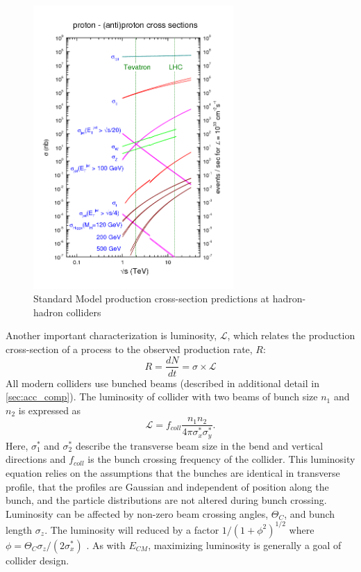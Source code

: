 \begin{figure}[h]
    \centering
    \includegraphics[width=3in]{figures/chapter2/cross_sec_plot.png}
    \caption{Standard Model production cross-section predictions at hadron-hadron colliders\cite{prod_crosssec}}
    \label{fig:crosssec}
\end{figure}

Another important characterization is luminosity, $\mathcal{L}$, which relates the production cross-section of a process to the observed production rate, $R$: $$R=\frac{dN}{dt}=\sigma\times\mathcal{L}$$ \noindent All modern colliders use bunched beams (described in additional detail in \ref{sec:acc_comp}). The luminosity of collider with two beams of bunch size $n_1$ and $n_2$ is expressed as $$\mathcal{L}=f_{coll}\frac{n_1n_2}{4\pi\sigma_x^*\sigma_y^*}.$$ \noindent Here, $\sigma_1^*$ and $\sigma_2^*$ describe the transverse beam size in the bend and vertical directions and $f_{coll}$ is the bunch crossing frequency of the collider. This luminosity equation relies on the assumptions that the bunches are identical in transverse profile, that the profiles are Gaussian and independent of position along the bunch, and the particle distributions are not altered during bunch crossing. Luminosity can be affected by non-zero beam crossing angles, $\Theta_C$, and bunch length $\sigma_z$. The luminosity will reduced by a factor $1/(1+\phi^2)^{1/2}$ where $\phi=\Theta_C\sigma_z/(2\sigma_x^*)$ \cite{pdg}. As with $E_{CM}$, maximizing luminosity is generally a goal of collider design. \\

